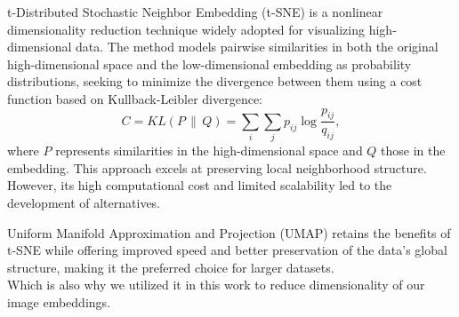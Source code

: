 \documentclass[
  a4paper,  %
  twoside,  %
  bibliography=totoc,
  headsepline,
  cleardoublepage=empty,
  parskip=half,
  draft=false
]{scrbook}
\begin{document}
t-Distributed Stochastic Neighbor Embedding (t-SNE) \cite{van2008visualizing} is a nonlinear dimensionality reduction technique widely adopted for visualizing high-dimensional data. The method models pairwise similarities in both the original high-dimensional space and the low-dimensional embedding as probability distributions, seeking to minimize the divergence between them using a cost function based on Kullback-Leibler divergence:
\begin{equation}
	C = KL(P \,\|\, Q) = \sum_i \sum_j p_{ij} \log \frac{p_{ij}}{q_{ij}},
\end{equation}
where $P$ represents similarities in the high-dimensional space and $Q$ those in the embedding. This approach excels at preserving local neighborhood structure. However, its high computational cost and limited scalability led to the development of alternatives.

Uniform Manifold Approximation and Projection (UMAP) retains the benefits of t-SNE while offering improved speed and better preservation of the data's global structure, making it the preferred choice for larger datasets.\\
Which is also why we utilized it in this work to reduce dimensionality of our image embeddings.
\end{document}
